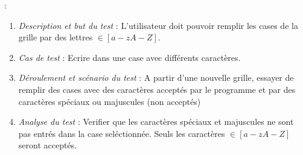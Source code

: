 \documentclass [ 11 pt ] {article}
\begin{document}
\newpage
{} :
\begin{tcolorbox}[colback=positifC]
            \begin{enumerate}
                \item \textit{Description et but du test} : L'utilisateur doit pouvoir remplir les cases de la grille par des lettres $ \in [a-zA-Z]$.\newline
                
                \item \textit{Cas de test} : Ecrire dans une case avec différents caractères. \newline
                
                \item \textit{Déroulement et scénario du test} : A partir d'une nouvelle grille, essayer de remplir des cases avec des caractères acceptés par le programme et par des caractères spéciaux ou majuscules (non acceptés)  \newline
                
                \item \textit{Analyse du test} : Verifier que les caractères spéciaux et majuscules ne sont pas entrés dans la case seléctionnée.  Seuls les caractères $\in[a-zA-Z]$ seront acceptés.
            \end{enumerate}
        \end{tcolorbox}
\end{document}
